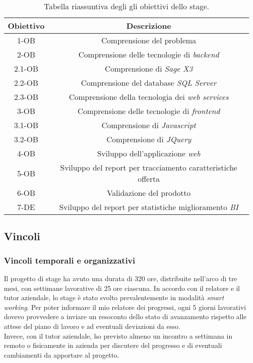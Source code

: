 \begin{center}
	\begin{longtable}{ | c| c |}
		\caption{Tabella riassuntiva degli gli obiettivi dello stage.}\\
		\hline
		\textbf{Obiettivo} & \textbf{Descrizione}\\
		\hline
		1-OB & Comprensione del problema\\
		\hline
		2-OB & Comprensione delle tecnologie di \textit{backend}\\
		\hline
		2.1-OB & Comprensione di \textit{Sage X3}\\
		\hline
		2.2-OB & Comprensione del database \textit{SQL Server}\\
		\hline
		2.3-OB & Comprensione della tecnologia dei \textit{web services}\\
		\hline
		3-OB & Comprensione delle tecnologie di \textit{frontend}\\
		\hline
		3.1-OB & Comprensione di \textit{Javascript}\\
		\hline
		3.2-OB & Comprensione di \textit{JQuery}\\
		\hline
		4-OB & Sviluppo dell'applicazione \textit{web}\\
		\hline
		5-OB & Sviluppo del report per tracciamento caratteristiche offerta\\
		\hline
		6-OB & Validazione del prodotto\\
		\hline
		7-DE & Sviluppo del report per statistiche miglioramento \textit{BI}\\
		\hline
	\end{longtable}
\end{center}


\subsection{Vincoli}
\subsubsection{Vincoli temporali e organizzativi}
Il progetto di stage ha avuto una durata di 320 ore, distribuite nell'arco di tre mesi, con settimane lavorative di 25 ore ciascuna.
In accordo con il relatore e il tutor aziendale, lo stage è stato svolto prevalentemente in modalità \textit{smart working}.
Per poter informare il mio relatore  dei progressi, ogni 5 giorni lavorativi dovevo provvedere a inviare un resoconto dello stato di avanzamento rispetto alle attese del piano di lavoro e ad eventuali deviazioni da esso.\\Invece, con il tutor aziendale, ho previsto almeno un incontro a settimana in remoto o fisicamente in azienda per discutere del progresso e di eventuali cambiamenti da apportare al progetto.
